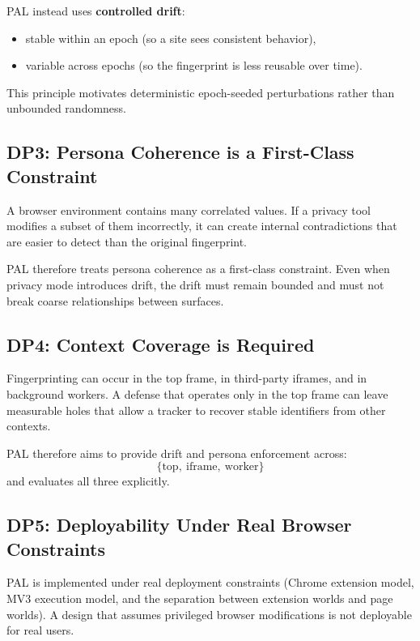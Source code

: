 \documentclass[11pt]{report}
\begin{document}
PAL instead uses \textbf{controlled drift}:
\begin{itemize}
    \item stable within an epoch (so a site sees consistent behavior),
    \item variable across epochs (so the fingerprint is less reusable over time).
\end{itemize}

This principle motivates deterministic epoch-seeded perturbations rather than unbounded randomness.

\subsection{DP3: Persona Coherence is a First-Class Constraint}

A browser environment contains many correlated values. If a privacy tool modifies a subset of them incorrectly, it can create internal contradictions that are easier to detect than the original fingerprint.

PAL therefore treats persona coherence as a first-class constraint. Even when privacy mode introduces drift, the drift must remain bounded and must not break coarse relationships between surfaces.

\subsection{DP4: Context Coverage is Required}

Fingerprinting can occur in the top frame, in third-party iframes, and in background workers. A defense that operates only in the top frame can leave measurable holes that allow a tracker to recover stable identifiers from other contexts.

PAL therefore aims to provide drift and persona enforcement across:
\[
\{\text{top},\ \text{iframe},\ \text{worker}\}
\]
and evaluates all three explicitly.

\subsection{DP5: Deployability Under Real Browser Constraints}

PAL is implemented under real deployment constraints (Chrome extension model, MV3 execution model, and the separation between extension worlds and page worlds). A design that assumes privileged browser modifications is not deployable for real users.
\end{document}
